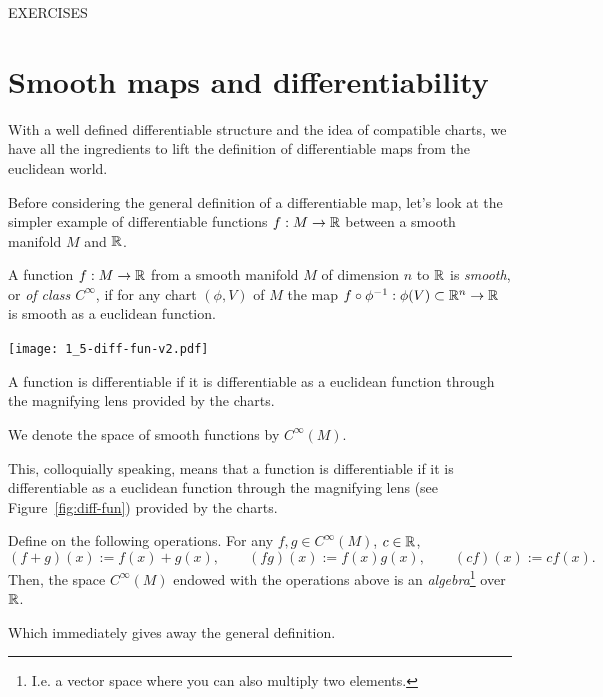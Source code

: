 EXERCISES

\section{Smooth maps and differentiability}

With a well defined differentiable structure and the idea of compatible charts, we have all the ingredients to lift the definition of differentiable maps from the euclidean world.

Before considering the general definition of a differentiable map, let's look at the simpler example of differentiable functions $f:M\to\mathbb{R}$ between a smooth manifold $M$ and $\mathbb{R}$.

\begin{defn}
  A function $f:M\to\mathbb{R}$ from a smooth manifold $M$ of dimension $n$ to $\mathbb{R}$ is \emph{smooth}, or \emph{of class $C^\infty$}, if for any chart $(\phi, V)$ of $M$ the map $f\circ\phi^{-1}:\phi(V)\subset\mathbb{R}^n \to \mathbb{R}$ is smooth as a euclidean function.
  \begin{marginfigure}
    \texttt{[image: 1\_5-diff-fun-v2.pdf]}
    \label{fig:diff-fun}
    \caption{A function is differentiable if it is differentiable as a euclidean function through the magnifying lens provided by the charts.}
  \end{marginfigure}
  We denote the space of smooth functions by $C^\infty(M)$.
\end{defn}

This, colloquially speaking, means that a function is differentiable if it is differentiable as a euclidean function through the magnifying lens (see Figure~\ref{fig:diff-fun}) provided by the charts.

\begin{exe}
  Define on the following operations.
  For any $f,g\in C^\infty(M)$, $c\in\mathbb{R}$,
  \begin{equation}
    (f+g)(x) := f(x) + g(x),\qquad
    (fg)(x) := f(x) g(x),\qquad
    (cf)(x) := c f(x).
  \end{equation}
  Then, the space $C^\infty(M)$ endowed with the operations above is an \emph{algebra}\footnote{I.e. a vector space where you can also multiply two elements.} over $\mathbb{R}$.
\end{exe}

Which immediately gives away the general definition.

